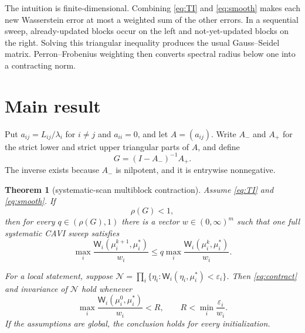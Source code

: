 \documentclass[11pt]{article}
\newtheorem{theorem}{Theorem}
\newcommand{\W}{\mathsf W}
\newcommand{\rhoSp}{\rho}
\begin{document}
The intuition is finite-dimensional.  Combining \eqref{eq:TI} and
\eqref{eq:smooth} makes each new Wasserstein error at most a weighted sum of
the other errors.  In a sequential sweep, already-updated blocks occur on
the left and not-yet-updated blocks on the right.  Solving this triangular
inequality produces the usual Gauss--Seidel matrix.  Perron--Frobenius
weighting then converts spectral radius below one into a contracting norm.

\section*{Main result}

Put $a_{ij}=L_{ij}/\lambda_i$ for $i\ne j$ and $a_{ii}=0$, and let
$A=(a_{ij})$.  Write $A_-$ and $A_+$ for the strict lower and strict upper
triangular parts of $A$, and define
\begin{equation}\label{eq:G}
 G=(I-A_-)^{-1}A_+.
\end{equation}
The inverse exists because $A_-$ is nilpotent, and it is entrywise
nonnegative.

\begin{theorem}[systematic-scan multiblock contraction]\label{thm:main}
Assume \eqref{eq:TI} and \eqref{eq:smooth}.  If
\begin{equation}\label{eq:spectral}
 \rhoSp(G)<1,
\end{equation}
then for every $q\in(\rhoSp(G),1)$ there is a vector $w\in(0,\infty)^m$
such that one full systematic CAVI sweep satisfies
\begin{equation}\label{eq:contract}
 \max_i\frac{\W_i(\mu_i^{k+1},\mu_i^*)}{w_i}
 \le q\max_i\frac{\W_i(\mu_i^k,\mu_i^*)}{w_i}.
\end{equation}

For a local statement, suppose
$\mathcal N=\prod_i\{\eta_i:\W_i(\eta_i,\mu_i^*)<\varepsilon_i\}$.
Then \eqref{eq:contract} and invariance of $\mathcal N$ hold whenever
\[
 \max_i\frac{\W_i(\mu_i^0,\mu_i^*)}{w_i}<R,
 \qquad R<\min_i\frac{\varepsilon_i}{w_i}.
\]
If the assumptions are global, the conclusion holds for every initialization.
\end{theorem}
\end{document}
